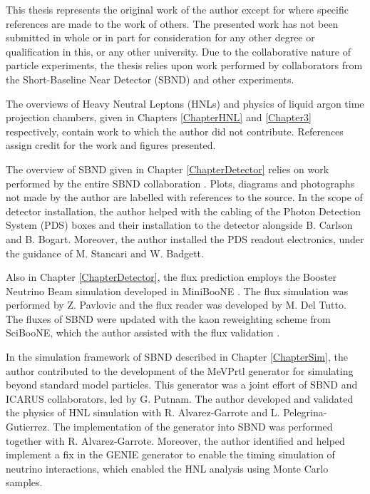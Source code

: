 
\begin{declaration}

This thesis represents the original work of the author except for where specific references are made to the work of others.
The presented work has not been submitted in whole or in part for consideration for any other degree or qualification in this, or any other university. 
Due to the collaborative nature of particle experiments, the thesis relies upon work performed by collaborators from the Short-Baseline Near Detector (SBND) and other experiments.

The overviews of Heavy Neutral Leptons (HNLs) and physics of liquid argon time projection chambers, given in Chapters \ref{ChapterHNL} and \ref{Chapter3} respectively, contain work to which the author did not contribute.
References assign credit for the work and figures presented.

The overview of SBND given in Chapter \ref{ChapterDetector} relies on work performed by the entire SBND collaboration \cite{SBNProgram,sbnd_det}.
Plots, diagrams and photographs not made by the author are labelled with references to the source.
In the scope of detector installation, the author helped with the cabling of the Photon Detection System (PDS) boxes and their installation to the detector alongside B. Carlson and B. Bogart.
Moreover, the author installed the PDS readout electronics, under the guidance of M. Stancari and W. Badgett.

Also in Chapter \ref{ChapterDetector}, the flux prediction employs the Booster Neutrino Beam simulation developed in MiniBooNE \cite{BNBFlux}.
The flux simulation was performed by Z. Pavlovic and the flux reader was developed by M. Del Tutto. 
The fluxes of SBND were updated with the kaon reweighting scheme from SciBooNE, which the author assisted with the flux validation \cite{SciBooNE}.

In the simulation framework of SBND described in Chapter \ref{ChapterSim}, the author contributed to the development of the MeVPrtl generator for simulating beyond standard model particles.
This generator was a joint effort of SBND and ICARUS collaborators, led by G. Putnam.
The author developed and validated the physics of HNL simulation with R. Alvarez-Garrote and L. Pelegrina-Gutierrez.
The implementation of the generator into SBND was performed together with R. Alvarez-Garrote.
Moreover, the author identified and helped implement a fix in the GENIE generator to enable the timing simulation of neutrino interactions, which enabled the HNL analysis using Monte Carlo samples.


\end{declaration}
